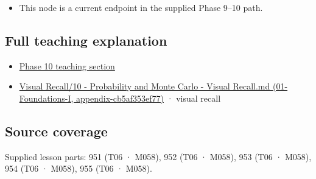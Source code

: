 \begin{itemize}
\tightlist
\item
  This node is a current endpoint in the supplied Phase 9--10 path.
\end{itemize}

\subsection{Full teaching explanation}\label{full-teaching-explanation}

\begin{itemize}
\tightlist
\item
  \href{Continuous\%20Notes/Computing\%20Foundations\%20-\%20From\%20Bits\%20to\%20C++\%20and\%20Systems\%20APIs\#9.\%20Finite\%20samples\%20need\%20stable\%20descriptive\%20statistics}{Phase 10 teaching section}
\item
  \href{}{Visual Recall/10 - Probability and Monte Carlo - Visual Recall.md (01-Foundations-I, appendix-cb5af353ef77)} · visual recall
\end{itemize}

\subsection{Source coverage}\label{source-coverage}

Supplied lesson parts: 951 (T06 · M058), 952 (T06 · M058), 953 (T06 · M058), 954 (T06 · M058), 955 (T06 · M058).
